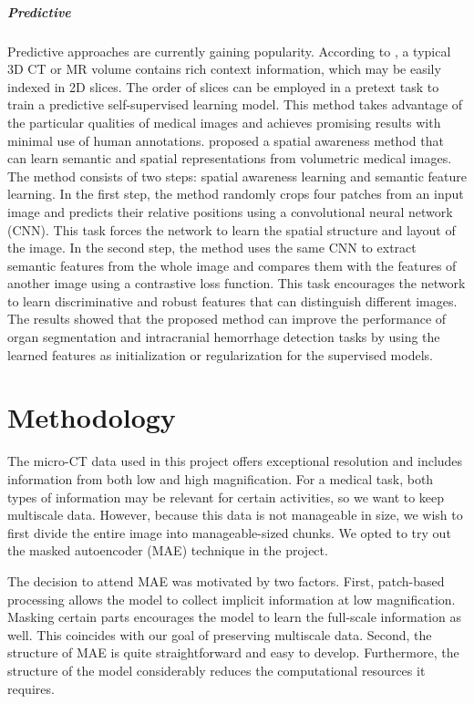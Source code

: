\documentclass[11pt,titlepage,openright]{book}
\begin{document}
\paragraph{\textbf{Predictive}}Predictive approaches are currently gaining popularity. According to \cite{zhang2017self}, a typical 3D CT or MR volume contains rich context information, which may be easily indexed in 2D slices. The order of slices can be employed in a pretext task to train a predictive self-supervised learning model. This method takes advantage of the particular qualities of medical images and achieves promising results with minimal use
of human annotations. \cite{nguyen2020self} proposed a spatial awareness method that can learn semantic and spatial representations from volumetric medical images. The method consists of two steps: spatial awareness learning and semantic feature learning. In the first step, the method randomly crops four patches from an input image and predicts their relative positions using a convolutional neural network (CNN). This task forces the network to learn the spatial structure and layout of the image. In the second step, the method uses the same CNN to extract semantic features from the whole image and compares them with the features of another image using a contrastive loss function. This task encourages the network to learn discriminative and robust features that can distinguish different images. The results showed that the proposed method can improve the performance of organ segmentation and intracranial hemorrhage detection tasks by using the learned features as initialization or regularization for the supervised models.


\chapter{Methodology}

The micro-CT data used in this project offers exceptional resolution and includes information from both low and high magnification. For a medical task, both types of information may be relevant for certain activities, so we want to keep multiscale data. However, because this data is not manageable in size, we wish to first divide the entire image into manageable-sized chunks. We opted to try out the masked autoencoder (MAE)\citep{he2022masked} technique in the project.

The decision to attend MAE was motivated by two factors. First, patch-based processing allows the model to collect implicit information at low magnification. Masking certain parts encourages the model to learn the full-scale information as well. This coincides with our goal of preserving multiscale data. Second, the structure of MAE is quite straightforward and easy to develop. Furthermore, the structure of the model considerably reduces the computational resources it requires. 
\end{document}
